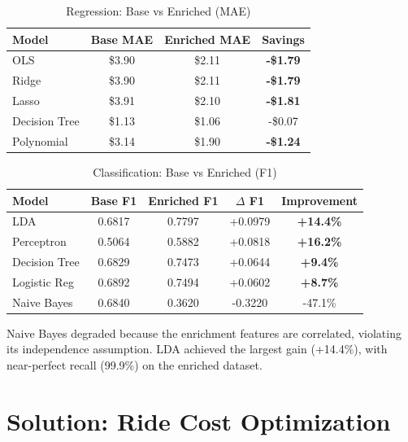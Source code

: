 \documentclass[12pt,a4paper]{article}
\begin{document}
\begin{table}[H]
\centering
\caption{Regression: Base vs Enriched (MAE)}
\begin{tabular}{lccc}
\toprule
\textbf{Model} & \textbf{Base MAE} & \textbf{Enriched MAE} & \textbf{Savings} \\
\midrule
OLS & \$3.90 & \$2.11 & \textbf{-\$1.79} \\
Ridge & \$3.90 & \$2.11 & \textbf{-\$1.79} \\
Lasso & \$3.91 & \$2.10 & \textbf{-\$1.81} \\
Decision Tree & \$1.13 & \$1.06 & -\$0.07 \\
Polynomial & \$3.14 & \$1.90 & \textbf{-\$1.24} \\
\bottomrule
\end{tabular}
\end{table}

\begin{table}[H]
\centering
\caption{Classification: Base vs Enriched (F1)}
\begin{tabular}{lcccc}
\toprule
\textbf{Model} & \textbf{Base F1} & \textbf{Enriched F1} & \textbf{$\Delta$ F1} & \textbf{Improvement} \\
\midrule
LDA & 0.6817 & 0.7797 & +0.0979 & \textbf{+14.4\%} \\
Perceptron & 0.5064 & 0.5882 & +0.0818 & \textbf{+16.2\%} \\
Decision Tree & 0.6829 & 0.7473 & +0.0644 & \textbf{+9.4\%} \\
Logistic Reg & 0.6892 & 0.7494 & +0.0602 & \textbf{+8.7\%} \\
Naive Bayes & 0.6840 & 0.3620 & -0.3220 & -47.1\% \\
\bottomrule
\end{tabular}
\end{table}

Naive Bayes degraded because the enrichment features are correlated, violating its independence assumption. LDA achieved the largest gain (+14.4\%), with near-perfect recall (99.9\%) on the enriched dataset.

\newpage

\section{Solution: Ride Cost Optimization}
\end{document}
